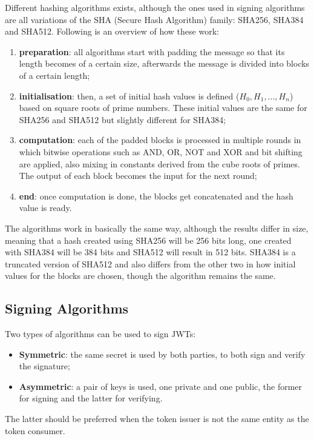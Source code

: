 Different hashing algorithms exists, although the ones used in signing algorithms are all variations of the SHA (Secure Hash Algorithm) family: SHA256, SHA384 and SHA512. Following is an overview of how these work: 
\begin{enumerate}
    \item \textbf{preparation}: all algorithms start with padding the message so that its length becomes of a certain size, afterwards the message is divided into blocks of a certain length;
    \item \textbf{initialisation}: then, a set of initial hash values is defined (\(H_0, H_1, ..., H_n\)) based on square roots of prime numbers. These initial values are the same for SHA256 and SHA512 but slightly different for SHA384;
    \item \textbf{computation}: each of the padded blocks is processed in multiple rounds in which bitwise operations such as AND, OR, NOT and XOR and bit shifting are applied, also mixing in constants derived from the cube roots of primes. The output of each block becomes the input for the next round;
    \item \textbf{end}: once computation is done, the blocks get concatenated and the hash value is ready.
\end{enumerate}
The algorithms work in basically the same way, although the results differ in size, meaning that a hash created using SHA256 will be 256 bits long, one created with SHA384 will be 384 bits and SHA512 will result in 512 bits. SHA384 is a truncated version of SHA512 and also differs from the other two in how initial values for the blocks are chosen, though the algorithm remains the same.
\cite{sha-family}

\subsection{Signing Algorithms}
Two types of algorithms can be used to sign JWTs:
\begin{itemize}[itemsep=-0.05em,topsep=2mm]
    \item \textbf{Symmetric}: the same secret is used by both parties, to both sign and verify the signature;
    \item \textbf{Asymmetric}: a pair of keys is used, one private and one public, the former for signing and the latter for verifying.
\end{itemize}
The latter should be preferred when the token issuer is not the same entity as the token consumer.

